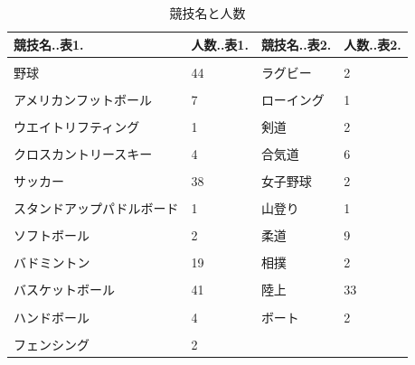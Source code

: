 \documentclass[12pt,a4paper,xelatex,ja=standard]{bxjsarticle}
\begin{document}
\begin{table}[!h]
\centering
\caption{\label{tab:unnamed-chunk-2}競技名と人数}
\centering
\fontsize{7}{9}\selectfont
\begin{tabular}[t]{llll}
\toprule
競技名..表1. & 人数..表1. & 競技名..表2. & 人数..表2.\\
\midrule
\cellcolor[HTML]{F5F5F5}{テニス} & \cellcolor[HTML]{F5F5F5}{13} & \cellcolor[HTML]{F5F5F5}{ライフセービング} & \cellcolor[HTML]{F5F5F5}{1}\\
野球 & 44 & ラグビー & 2\\
\cellcolor[HTML]{F5F5F5}{アイスホッケー} & \cellcolor[HTML]{F5F5F5}{5} & \cellcolor[HTML]{F5F5F5}{レスリング} & \cellcolor[HTML]{F5F5F5}{6}\\
アメリカンフットボール & 7 & ローイング & 1\\
\cellcolor[HTML]{F5F5F5}{アルペンスキー} & \cellcolor[HTML]{F5F5F5}{3} & \cellcolor[HTML]{F5F5F5}{体操} & \cellcolor[HTML]{F5F5F5}{6}\\
\addlinespace
ウエイトリフティング & 1 & 剣道 & 2\\
\cellcolor[HTML]{F5F5F5}{オーストラリアンフットボール} & \cellcolor[HTML]{F5F5F5}{6} & \cellcolor[HTML]{F5F5F5}{卓球} & \cellcolor[HTML]{F5F5F5}{10}\\
クロスカントリースキー & 4 & 合気道 & 6\\
\cellcolor[HTML]{F5F5F5}{ゴルフ} & \cellcolor[HTML]{F5F5F5}{5} & \cellcolor[HTML]{F5F5F5}{女子サーブル} & \cellcolor[HTML]{F5F5F5}{1}\\
サッカー & 38 & 女子野球 & 2\\
\addlinespace
\cellcolor[HTML]{F5F5F5}{ランニング} & \cellcolor[HTML]{F5F5F5}{1} & \cellcolor[HTML]{F5F5F5}{射撃} & \cellcolor[HTML]{F5F5F5}{1}\\
スタンドアップパドルボード & 1 & 山登り & 1\\
\cellcolor[HTML]{F5F5F5}{ソフトテニス} & \cellcolor[HTML]{F5F5F5}{45} & \cellcolor[HTML]{F5F5F5}{新体操} & \cellcolor[HTML]{F5F5F5}{2}\\
ソフトボール & 2 & 柔道 & 9\\
\cellcolor[HTML]{F5F5F5}{ダンス} & \cellcolor[HTML]{F5F5F5}{1} & \cellcolor[HTML]{F5F5F5}{水泳} & \cellcolor[HTML]{F5F5F5}{7}\\
\addlinespace
バドミントン & 19 & 相撲 & 2\\
\cellcolor[HTML]{F5F5F5}{トライアスロン} & \cellcolor[HTML]{F5F5F5}{2} & \cellcolor[HTML]{F5F5F5}{空手} & \cellcolor[HTML]{F5F5F5}{3}\\
バスケットボール & 41 & 陸上 & 33\\
\cellcolor[HTML]{F5F5F5}{バレーボール} & \cellcolor[HTML]{F5F5F5}{17} & \cellcolor[HTML]{F5F5F5}{駅伝} & \cellcolor[HTML]{F5F5F5}{1}\\
ハンドボール & 4 & ボート & 2\\
\addlinespace
\cellcolor[HTML]{F5F5F5}{ビーチバレーボール} & \cellcolor[HTML]{F5F5F5}{1} & \cellcolor[HTML]{F5F5F5}{ボウリング} & \cellcolor[HTML]{F5F5F5}{1}\\
フェンシング & 2 &  & \\
\bottomrule
\end{tabular}
\end{table}
\end{document}
